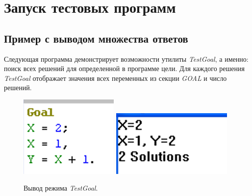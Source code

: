\documentclass[a4paper,12pt]{article}
\begin{document}
	\newpage
	
	\section{Запуск тестовых программ}
	
	\subsection{Пример с выводом множества ответов}
	
	Следующая программа демонстрирует возможности утилиты \textit{TestGoal}, а именно:  поиск всех решений для определенной в программе цели. Для каждого
	решения \textit{TestGoal} отображает значения всех переменных из секции \textit{GOAL} и число решений.
	
		\begin{figure}[h!]
		\begin{center}
			\begin{minipage}[h!]{0.3\linewidth}
				\includegraphics[width=1\linewidth]{goal.png}
			\end{minipage}
			\begin{minipage}[h!]{0.3\linewidth}
				\includegraphics[width=1\linewidth]{result.png}
			\end{minipage}
			\label{ris:testgoal}
			\caption{Вывод режима \textit{TestGoal}.}
		\end{center}
	\end{figure}
	
\end{document}
